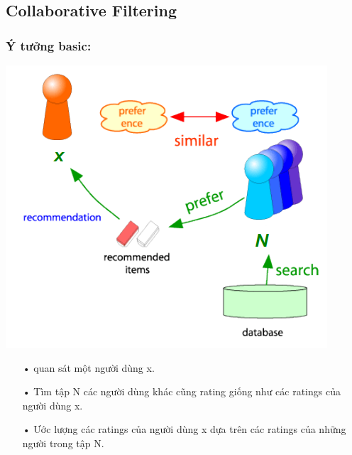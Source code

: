 \documentclass[a0,portrait,11pt]{a0poster}
\begin{document}
\begin{multicols}{2}
\begin{mybox}
\section*{Collaborative Filtering}
\subsubsection*{Ý tưởng basic:}
\begin{minipage}[c]{0.45\linewidth}
\includegraphics[width=0.8\linewidth]{CF.png}
\end{minipage}
\begin{minipage}[b]{0.45\linewidth}
\begin{itemize}
\item[•] quan sát một người dùng x.
\item[•] Tìm tập N các người dùng khác cũng rating giống như các ratings của
người dùng x.
\item[•] Ước lượng các ratings của người dùng x dựa trên các ratings của những
người trong tập N.
\end{itemize}
\end{minipage}

\end{mybox}
\end{multicols}
\end{document}
